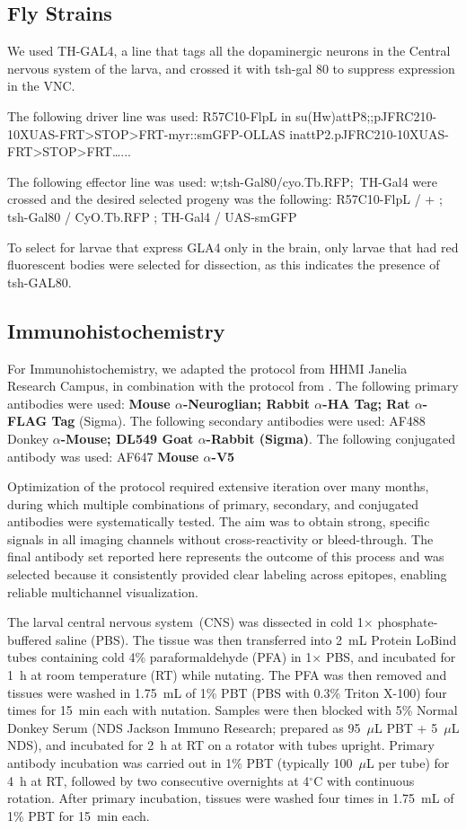     \subsection{Fly Strains}
    We used TH-GAL4, a line that tags all the dopaminergic neurons in the Central nervous system of the larva, and crossed it with tsh-gal 80 to suppress expression in the VNC. 

    The following driver line was used:
    R57C10-FlpL in su(Hw)attP8;;pJFRC210-10XUAS-FRT>STOP>FRT-myr::smGFP-OLLAS inattP2.pJFRC210-10XUAS-FRT>STOP>FRT…...

    The following effector line was used:
    w;tsh-Gal80/cyo.Tb.RFP; TH-Gal4
    were crossed and the desired selected progeny was the following:
    R57C10-FlpL / + ; tsh-Gal80 / CyO.Tb.RFP ; TH-Gal4 / UAS-smGFP


    To select for larvae that express GLA4 only in the brain, only larvae that had red fluorescent bodies were selected for dissection, as this indicates the presence of tsh-GAL80.

\subsection{Immunohistochemistry}
    For Immunohistochemistry, we adapted the protocol from HHMI Janelia Research Campus, in combination with the protocol from \citep{nern2015multicolor}. The following primary antibodies were used: \textbf{Mouse $\alpha$-Neuroglian; Rabbit $\alpha$-HA Tag; Rat $\alpha$-FLAG Tag} (Sigma). The following secondary antibodies were used: AF488 Donkey \textbf{$\alpha$-Mouse; DL549 Goat $\alpha$-Rabbit (Sigma)}. The following conjugated antibody was used: AF647 \textbf{Mouse $\alpha$-V5} 

    Optimization of the protocol required extensive iteration over many months, during which multiple combinations of primary, secondary, and conjugated antibodies were systematically tested. The aim was to obtain strong, specific signals in all imaging channels without cross-reactivity or bleed-through. The final antibody set reported here represents the outcome of this process and was selected because it consistently provided clear labeling across epitopes, enabling reliable multichannel visualization.

    The larval central nervous system~(CNS) was dissected in cold 1$\times$ phosphate-buffered saline (PBS). The tissue was then transferred into 2~mL Protein LoBind tubes containing cold 4\% paraformaldehyde (PFA) in 1$\times$ PBS, and incubated for 1~h at room temperature (RT) while nutating. The PFA was then removed and tissues were washed in 1.75~mL of 1\% PBT (PBS with 0.3\% Triton X-100) four times for 15~min each with nutation.  
    Samples were then blocked with 5\% Normal Donkey Serum (NDS Jackson Immuno Research; prepared as 95~$\mu$L PBT + 5~$\mu$L NDS), and incubated for 2~h at RT on a rotator with tubes upright.
    Primary antibody incubation was carried out in 1\% PBT (typically 100~$\mu$L per tube) for 4~h at RT, followed by two consecutive overnights at 4$^\circ$C with continuous rotation.  After primary incubation, tissues were washed four times in 1.75~mL of 1\% PBT for 15~min each.  

